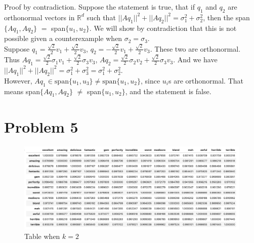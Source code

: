 \documentclass[11pt]{article}
\begin{document}
Proof by contradiction. Suppose the statement is true, that if $q_1$ and $q_2$ are orthonormal vectors in $\mathbb{R}^d$ such that $||Aq_1||^2+||Aq_2||^2 = \sigma_1^2 + \sigma_2^2$, then the span$\{Aq_1,Aq_2\}$ $=$ span$\{u_1,u_2\}$. We will show by contradiction that this is not possible given a counterexample when $\sigma_2 = \sigma_3$. \\

Suppose $q_1 = \frac{\sqrt{2}}{2}v_1 + \frac{\sqrt{2}}{2}v_3$, $q_2 = -\frac{\sqrt{2}}{2}v_1 + \frac{\sqrt{2}}{2}v_3$. These two are orthonormal. \\

Thus $Aq_1 = \frac{\sqrt{2}}{2}\sigma_1v_1 + \frac{\sqrt{2}}{2}\sigma_3 v_3$, $Aq_2 = \frac{\sqrt{2}}{2}\sigma_2v_2 + \frac{\sqrt{2}}{2}\sigma_3 v_3$. And we have $||Aq_1||^2+||Aq_2||^2 = \sigma_1^2 + \sigma_3^2 = \sigma_1^2 + \sigma_2^2$. \\

However, $Aq_1 \in \text{span}\{u_1,u_3\} \neq \text{span}\{u_1,u_2\}$, since $u_i$s are orthonormal. That means span$\{Aq_1,Aq_2\}$ $\neq$ span$\{u_1,u_2\}$, and the statement is false.



\section*{Problem 5}
\begin{figure}[H]
    \centering
    \includegraphics[scale=0.4]{images/5a.png}
    \caption{Table when $k=2$}
\end{figure}
\end{document}
